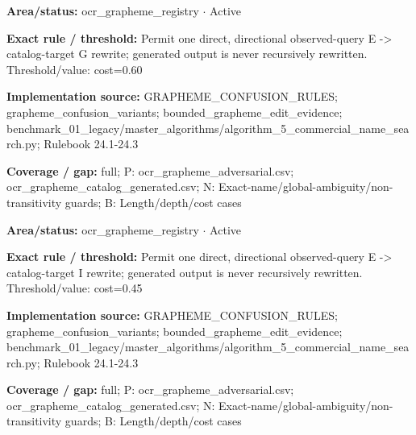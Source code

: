 \begin{tcolorbox}[enhanced,breakable,colback=white,colframe=Muted!45,boxrule=0.45pt,arc=1.5pt,left=6pt,right=6pt,top=5pt,bottom=5pt,title={\texttt{OCR-GRAPHEME-E-TO-G}},title after break={\texttt{OCR-GRAPHEME-E-TO-G}\ (continued)},fonttitle=\headingfont\bfseries\color{Navy},coltitle=Navy]
\textbf{Area/status:} ocr\_\allowbreak{}grapheme\_\allowbreak{}registry $\boldsymbol{\cdot}$ Active\par
\smallskip
\textbf{Exact rule / threshold:} Permit one direct, directional observed-query E -> catalog-target G rewrite; generated output is never recursively rewritten. Threshold/\allowbreak{}value: cost=0.60\par
\smallskip
\textbf{Implementation source:} GRAPHEME\_\allowbreak{}CONFUSION\_\allowbreak{}RULES; grapheme\_\allowbreak{}confusion\_\allowbreak{}variants; bounded\_\allowbreak{}grapheme\_\allowbreak{}edit\_\allowbreak{}evidence; benchmark\_\allowbreak{}01\_\allowbreak{}legacy/\allowbreak{}master\_\allowbreak{}algorithms/\allowbreak{}algorithm\_\allowbreak{}5\_\allowbreak{}commercial\_\allowbreak{}name\_\allowbreak{}search.py; Rulebook 24.1-24.3\par
\smallskip
\textbf{Coverage / gap:} full; P: ocr\_\allowbreak{}grapheme\_\allowbreak{}adversarial.csv; ocr\_\allowbreak{}grapheme\_\allowbreak{}catalog\_\allowbreak{}generated.csv; N: Exact-name/\allowbreak{}global-ambiguity/\allowbreak{}non-transitivity guards; B: Length/\allowbreak{}depth/\allowbreak{}cost cases
\end{tcolorbox}
\begin{tcolorbox}[enhanced,breakable,colback=white,colframe=Muted!45,boxrule=0.45pt,arc=1.5pt,left=6pt,right=6pt,top=5pt,bottom=5pt,title={\texttt{OCR-GRAPHEME-E-TO-I}},title after break={\texttt{OCR-GRAPHEME-E-TO-I}\ (continued)},fonttitle=\headingfont\bfseries\color{Navy},coltitle=Navy]
\textbf{Area/status:} ocr\_\allowbreak{}grapheme\_\allowbreak{}registry $\boldsymbol{\cdot}$ Active\par
\smallskip
\textbf{Exact rule / threshold:} Permit one direct, directional observed-query E -> catalog-target I rewrite; generated output is never recursively rewritten. Threshold/\allowbreak{}value: cost=0.45\par
\smallskip
\textbf{Implementation source:} GRAPHEME\_\allowbreak{}CONFUSION\_\allowbreak{}RULES; grapheme\_\allowbreak{}confusion\_\allowbreak{}variants; bounded\_\allowbreak{}grapheme\_\allowbreak{}edit\_\allowbreak{}evidence; benchmark\_\allowbreak{}01\_\allowbreak{}legacy/\allowbreak{}master\_\allowbreak{}algorithms/\allowbreak{}algorithm\_\allowbreak{}5\_\allowbreak{}commercial\_\allowbreak{}name\_\allowbreak{}search.py; Rulebook 24.1-24.3\par
\smallskip
\textbf{Coverage / gap:} full; P: ocr\_\allowbreak{}grapheme\_\allowbreak{}adversarial.csv; ocr\_\allowbreak{}grapheme\_\allowbreak{}catalog\_\allowbreak{}generated.csv; N: Exact-name/\allowbreak{}global-ambiguity/\allowbreak{}non-transitivity guards; B: Length/\allowbreak{}depth/\allowbreak{}cost cases
\end{tcolorbox}
